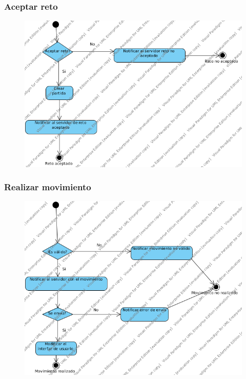\subsubsection{Aceptar reto}
 \begin{figure}[h]
 \centering
 \includegraphics[scale=0.5]{img/ms_aceptarRetoCliente.png}
 \end{figure}
 \clearpage
\subsubsection{Realizar movimiento}
 \begin{figure}[h]
 \centering
 \includegraphics[scale=0.5]{img/ms_RealizarMovimientoCliente.png}
 \end{figure}
